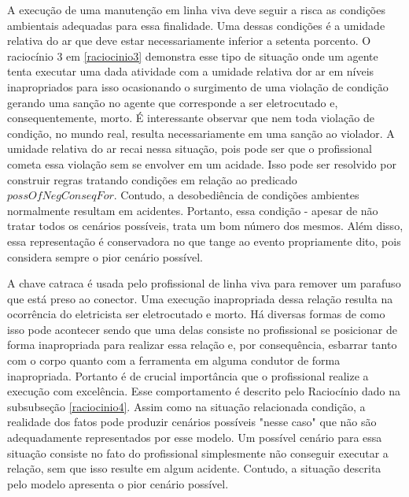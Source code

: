 A execução de uma manutenção em linha viva deve seguir a risca as condições ambientais adequadas para essa finalidade. Uma dessas condições é a umidade relativa do ar que deve estar necessariamente inferior a setenta porcento. O raciocínio 3 em \ref{raciocinio3} demonstra esse tipo de situação onde um agente tenta executar uma dada atividade com a umidade relativa dor ar em níveis inapropriados para isso ocasionando o surgimento de uma violação de condição gerando uma sanção no agente que corresponde a ser eletrocutado e, consequentemente, morto. É interessante observar que nem toda violação de condição, no mundo real, resulta necessariamente em uma sanção ao violador. A umidade relativa do ar recai nessa situação, pois pode ser que o profissional cometa essa violação sem se envolver em um acidade. Isso pode ser resolvido por construir regras tratando condições em relação ao predicado $possOfNegConseqFor$. Contudo, a desobediência de condições ambientes normalmente resultam em acidentes. Portanto, essa condição - apesar de não tratar todos os cenários possíveis, trata um bom número dos mesmos. Além disso, essa representação é conservadora no que tange ao evento propriamente dito, pois considera sempre o pior 
cenário possível.

A chave catraca é usada pelo profissional de linha viva para remover um parafuso que está preso ao conector. Uma execução inapropriada dessa relação resulta na ocorrência do eletricista ser eletrocutado e morto. Há diversas formas de como isso pode acontecer sendo que uma delas consiste no profissional se posicionar de forma inapropriada para realizar essa relação e, por consequência, esbarrar tanto com o corpo quanto com a ferramenta em alguma condutor de forma inapropriada. Portanto é de crucial importância que o profissional realize a execução com excelência. Esse comportamento é descrito pelo Raciocínio dado na subsubseção \ref{raciocinio4}. Assim como na situação relacionada condição, a realidade dos fatos pode produzir cenários possíveis "nesse caso" que não são adequadamente representados por esse modelo. Um possível cenário para essa situação consiste no fato do profissional simplesmente não conseguir executar a relação, sem que isso resulte em algum acidente. Contudo, a situação descrita pelo modelo apresenta o pior cenário possível. 

